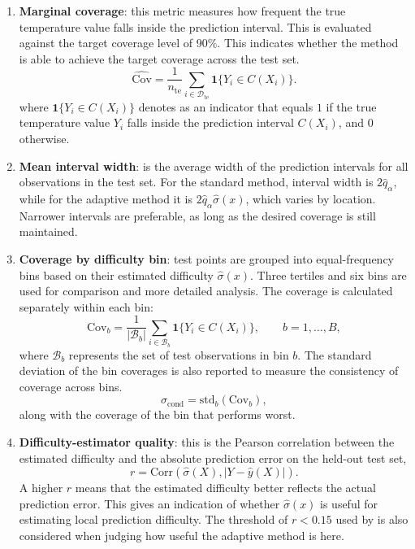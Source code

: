 \documentclass[11pt,a4paper]{report}
\begin{document}
\begin{enumerate}
\item \textbf{Marginal coverage}: this metric measures how frequent the true temperature value falls inside the prediction interval. This is evaluated against the target coverage level of 90\%. This indicates whether the method is able to achieve the target coverage across the test set.
\begin{equation}
\widehat{\mathrm{Cov}}
=
\frac{1}{n_{\mathrm{te}}}
\sum_{i\in\mathcal{D}_{\mathrm{te}}}
\mathbf{1}\{Y_i\in C(X_i)\}.
\end{equation}
where $\mathbf{1}\{Y_i\in C(X_i)\}$ denotes as an indicator that equals $1$ if the true temperature value $Y_i$ falls inside the prediction interval $C(X_i)$, and $0$ otherwise.

\item \textbf{Mean interval width}: is the average width of the prediction intervals for all observations in the test set. For the standard method, interval width is $2\hat q_\alpha$, while for the adaptive method it is $2\hat q_\alpha\hat\sigma(x)$, which varies by location. Narrower intervals are preferable, as long as the desired coverage is still maintained.

\item \textbf{Coverage by difficulty bin}: test points are grouped into equal-frequency bins based on their estimated difficulty $\hat\sigma(x)$. Three tertiles and six bins are used for comparison and more detailed analysis. The coverage is calculated separately within each bin:
\begin{equation}
    \mathrm{Cov}_b
    =
    \frac{1}{|\mathcal{B}_b|}
    \sum_{i\in\mathcal{B}_b}
    \mathbf{1}\{Y_i\in C(X_i)\},
    \qquad b=1,\ldots,B,
\end{equation}
where $\mathcal{B}_b$ represents the set of test observations in bin $b$. The standard deviation of the bin coverages is also reported to measure the consistency of coverage across bins.
\begin{equation}
    \sigma_{\mathrm{cond}}
    =
    \mathrm{std}_b(\mathrm{Cov}_b),
\end{equation}
along with the coverage of the bin that performs worst.

\item \textbf{Difficulty-estimator quality}: this is the Pearson correlation between the estimated difficulty and the absolute prediction error on the held-out test set,
\begin{equation}
    r=
    \mathrm{Corr}
    \left(
    \hat\sigma(X),
    |Y-\hat y(X)|
    \right).
\end{equation}
A higher $r$ means that the estimated difficulty better reflects the actual prediction error. This gives an indication of whether $\hat\sigma(x)$ is useful for estimating local prediction difficulty. The threshold of $r<0.15$ used by \citet{amirishahbazi2026} is also considered when judging how useful the adaptive method is here. 
\end{enumerate}
\end{document}
